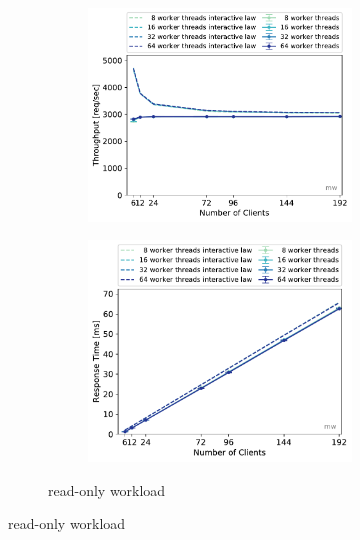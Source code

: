 \documentclass[report.tex]{subfiles}
\begin{document}
\begin{figure}[H]
\begin{subfigure}{\linewidth}
	\begin{subfigure}[b]{.499\linewidth}
		\centering
		\includegraphics[width=\linewidth]{data/exp31_ro_tp_nc_w.pdf}
	\end{subfigure}\hfill
	\begin{subfigure}[b]{.499\linewidth}
		\centering
		\includegraphics[width=\linewidth]{data/exp31_ro_rt_nc_w.pdf}
	\end{subfigure}%
	\caption{read-only workload}\label{exp31_ro_tp_nc}

\end{subfigure}
\end{figure}
\end{document}
